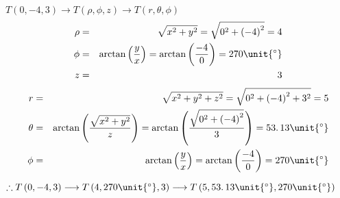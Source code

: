 \documentclass{article}
\begin{document}
$T\left( 0,-4,3\right) \longrightarrow T\left( \rho ,\phi ,z\right)
\longrightarrow T\left( r,\theta ,\phi \right) $ 
\begin{eqnarray*}
\rho &=&\sqrt{x^{2}+y^{2}}=\sqrt{0^{2}+\left( -4\right) ^{2}}=4 \\
\phi &=&\arctan \left( \dfrac{y}{x}\right) =\arctan \left( \dfrac{-4}{0}%
\right) =270\unit{%
{{}^\circ}%
} \\
z &=&3
\end{eqnarray*}
\begin{eqnarray*}
r &=&\sqrt{x^{2}+y^{2}+z^{2}}=\sqrt{0^{2}+\left( -4\right) ^{2}+3^{2}}=5 \\
\theta &=&\arctan \left( \dfrac{\sqrt{x^{2}+y^{2}}}{z}\right) =\arctan
\left( \dfrac{\sqrt{0^{2}+\left( -4\right) ^{2}}}{3}\right)
=53.\,\allowbreak 13\unit{%
{{}^\circ}%
} \\
\phi &=&\arctan \left( \dfrac{y}{x}\right) =\arctan \left( \dfrac{-4}{0}%
\right) =270\unit{%
{{}^\circ}%
}
\end{eqnarray*}

$\therefore T\left( 0,-4,3\right) \longrightarrow T\left( 4,270\unit{%
{{}^\circ}%
},3\right) \longrightarrow T\left( 5,53.\,\allowbreak 13\unit{%
{{}^\circ}%
},270\unit{%
{{}^\circ}%
}\right) $
\end{document}
